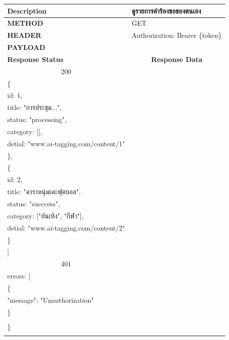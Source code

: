 \documentclass[12pt,oneside,openright,a4paper]{cpe-thai-project}
\begin{document}
\begin{itemize}
\begin{longtable}[!ht]{p{3cm}|p{8cm}}
    \textbf{Description}      & ดูรายการคำร้องขอของตนเอง                                                                                     \\ \hline
    \textbf{METHOD}           & GET                                                                                                                 \\ \hline
    \textbf{HEADER}           & Authorization: Bearer \{token\}                                                                                         \\ \hline
    \textbf{PAYLOAD}          &   \\ \hline \newpage \hline
    \textbf{Response Status}  & \multicolumn{1}{c}{\textbf{Response Data}}                                                                          \\ \hline
    \multicolumn{1}{c|}{200}  &
    \begin{tabular}[c]{@{}l@{}}{[}\\ \quad\{\\ \quad\quad id: 1,\\ \quad\quad title: "การประชุม...",\\\quad\quad status: "processing",\\ 
      \quad\quad category: {[}{]},\\ \quad\quad detial: "www.ai-tagging.com/content/1"\\ \quad\},\\ 
      \quad\{\\ \quad\quad id: 2,\\ \quad\quad title: "ดาราหนุ่มเตะฟุตบอล",\\\quad\quad status: "succcess",\\ 
      \quad\quad category: {[}"บันเทิง", "กีฬา"{]},\\ \quad\quad detial: "www.ai-tagging.com/content/2"\\ \quad \}\\{]}\end{tabular}  \\ \hline
    \multicolumn{1}{c|}{401}  &
    \begin{tabular}[c]{@{}l@{}}\{\\ \quad errors: {[}\\ \quad\quad\{\\ \quad\quad\quad"message": "Unauthorization"\\ \quad\quad\}\\\quad {]}\\ \}\end{tabular}                                                                         \\ \hline
    \hhline{==}
\end{longtable}


\end{itemize}
\end{document}
